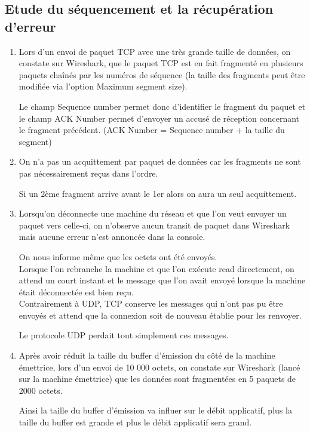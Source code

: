\documentclass{article}
\begin{document}
\subsection*{Etude du séquencement et la récupération d'erreur}

\begin{enumerate}[resume]
	\item Lors d'un envoi de paquet TCP avec une très grande taille de données, on constate sur Wireshark, que le paquet TCP est en fait fragmenté en plusieurs paquets chaînés par les numéros de séquence (la taille des fragments peut être modifiée via l'option Maximum segment size).

Le champ Sequence number permet donc d'identifier le fragment du paquet et le champ ACK Number permet d'envoyer un accusé de réception concernant le fragment précédent. (ACK Number = Sequence number + la taille du segment)

	\item On n'a pas un acquittement par paquet de données car les fragments ne sont pas nécessairement reçus dans l'ordre.

Si un 2ème fragment arrive avant le 1er alors on aura un seul acquittement.

	\item Lorsqu'on déconnecte une machine du réseau et que l'on veut envoyer un paquet vers celle-ci, on n'observe aucun transit de paquet dans Wireshark mais aucune erreur n'est annoncée dans la console.

On nous informe même que les octets ont été envoyés.\\

Lorsque l'on rebranche la machine et que l'on exécute read directement, on attend un court instant et le message que l'on avait envoyé lorsque la machine était déconnectée est bien reçu.\\

Contrairement à UDP, TCP conserve les messages qui n'ont pas pu être envoyés et attend que la connexion soit de nouveau établie pour les renvoyer.

Le protocole UDP perdait tout simplement ces messages.

	\item Après avoir réduit la taille du buffer d'émission du côté de la machine émettrice, lors d'un envoi de 10 000 octets, on constate sur Wireshark (lancé sur la machine émettrice) que les données sont fragmentées en 5 paquets de 2000 octets.

Ainsi la taille du buffer d'émission va influer sur le débit applicatif, plus la taille du buffer est grande et plus le débit applicatif sera grand.


\end{enumerate}
\end{document}
